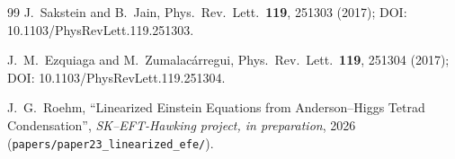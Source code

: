 \documentclass[aps,prl,reprint,nofootinbib,superscriptaddress]{revtex4-2}
\begin{document}
\begin{thebibliography}{99}
J.~Sakstein and B.~Jain,
Phys.\ Rev.\ Lett.\ \textbf{119}, 251303 (2017);
DOI: 10.1103/PhysRevLett.119.251303.

J.~M.~Ezquiaga and M.~Zumalac\'arregui,
Phys.\ Rev.\ Lett.\ \textbf{119}, 251304 (2017);
DOI: 10.1103/PhysRevLett.119.251304.

J.~G.~Roehm, ``Linearized Einstein Equations from
Anderson--Higgs Tetrad Condensation'',
\emph{SK--EFT-Hawking project, in preparation}, 2026
(\texttt{papers/paper23\_linearized\_efe/}).

\end{thebibliography}




\end{document}
